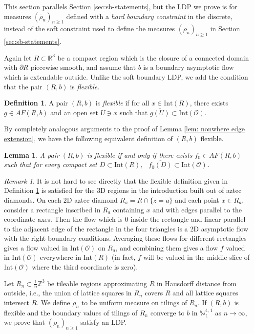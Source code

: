 \documentclass[11pt]{article}
\newtheorem{lemma}[thm]{Lemma}
\theoremstyle{remark}
\newtheorem{rem}[thm]{Remark}
\theoremstyle{definition}
\newtheorem{definition}[thm]{Definition}
\newcommand{\mc}[1]{\mathcal{#1}}
\newcommand{\m}[1]{\mathbb{#1}}
\newcommand{\termindex}[1]{\index{{\textbf{Terms}}!#1}}
\begin{document}
This section parallels Section \ref{sec:sb-statements}, but the LDP we prove is for measures $(\overline{\rho}_n)_{n\geq 1}$ defined with a \textit{hard boundary constraint} in the discrete, instead of the soft constraint used to define the measures $(\rho_n)_{n\geq 1}$ in Section \ref{sec:sb-statements}. 

Again let $R\subset \m R^3$ be a compact region which is the closure of a connected domain with $\partial R$ piecewise smooth, and assume that $b$ is a boundary asymptotic flow which is extendable outside. Unlike the soft boundary LDP, we add the condition that the pair $(R,b)$ is \textit{flexible}. 
\begin{definition}\label{def:fully_flexible} \termindex{Chapter 8!flexible}
    A pair $(R,b)$ is \textit{flexible} if for all $x\in \text{Int}(R)$, there exists $g\in AF(R,b)$ and an open set $U\ni x$ such that $\overline{g(U)}\subset \text{Int}(\mc O)$. 
\end{definition}
By completely analogous arguments to the proof of Lemma \ref{lem: nonwhere edge extension}, we have the following equivalent definition of $(R,b)$ flexible. 
\begin{lemma}\label{lem:fully_flexible}
    A pair $(R,b)$ is {flexible} if and only if there exists $f_0\in AF(R,b)$ such that for every compact set $D\subset \text{Int}(R)$, \, $\overline{f_0(D)}\subset \text{Int}(\mc O)$.
\end{lemma}
\begin{rem}\label{rem:aztec_is_flexible}
It is not hard to see directly that the flexible definition given in Definition \ref{def:fully_flexible} is satisfied for the 3D regions in the introduction built out of aztec diamonds. On each 2D aztec diamond $R_a= R \cap \{z = a\}$ and each point $x\in R_a$, consider a rectangle inscribed in $R_a$ containing $x$ and with edges parallel to the coordinate axes. Then the flow which is $0$ inside the rectangle and linear parallel to the adjacent edge of the rectangle in the four triangles is a 2D asymptotic flow with the right boundary conditions. Averaging these flows for different rectangles gives a flow valued in $\text{Int}(\mc O)$ on $R_a$, and combining them gives a flow $f$ valued in $\text{Int}(\mc O)$ everywhere in $\text{Int}(R)$ (in fact, $f$ will be valued in the middle slice of $\text{Int}(\mc O)$ where the third coordinate is zero). 
\end{rem}


Let $R_n\subset \frac{1}{n} \m Z^3$ be tileable regions approximating $R$ in Hausdorff distance from outside, i.e., the union of lattice squares in $R_n$ covers $R$ and all lattice squares intersect $R$. 
We define $\overline{\rho}_n$ to be uniform measure on tilings of $R_n$. %
If $(R,b)$ is flexible and the boundary values of tilings of $R_n$ converge to $b$ in $\m W_1^{1,1}$ as $n\to \infty$, we prove that $(\overline{\rho}_n)_{n\geq 1}$ satisfy an LDP.
\end{document}
